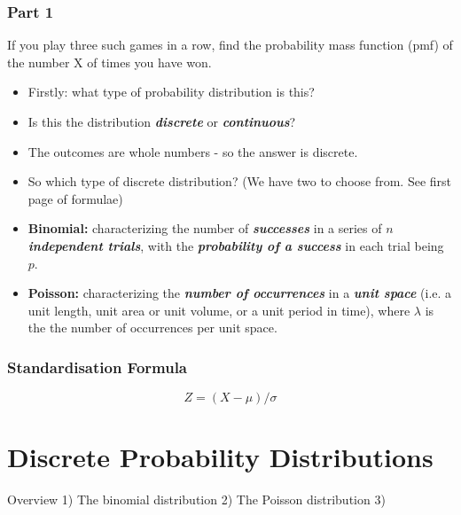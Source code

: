 \documentclass[12pt]{report}
\begin{document}
\subsection*{Part 1}{\LARGE If you play three such games in a row, find the probability mass function (pmf) of the number
	X of times you have won.}

{\LARGE
	\begin{itemize}
		\item Firstly: what type of probability distribution is this?
		
		\item Is this the distribution \textbf{\emph{discrete}} or  \textbf{\emph{continuous}}?
		
		\item The outcomes are whole numbers - so the answer is discrete.
		
		\item So which type of discrete distribution? (We have two to choose from. See first page of formulae)
		
		
		\item \textbf{Binomial:} characterizing the number of \textbf{\emph{successes}} in a series of \textbf{\emph{$n$ independent trials}}, with the \textbf{\emph{probability of a success}} in each trial being $p$.
		
		\item \textbf{Poisson:}  characterizing the \textbf{\emph{number of occurrences}} in a \textbf{\emph{unit space}} (i.e. a unit length, unit area or unit volume, or a unit period in time), where $\lambda$ is the the number of occurrences per unit space.
		
	\end{itemize}
}


\subsection{Standardisation Formula}

\begin{equation}
Z = ( X - \mu ) / \sigma
\end{equation}


 		\chapter{Discrete Probability Distributions}
Overview
1) The binomial distribution
2) The Poisson distribution
3) 
\end{document}

